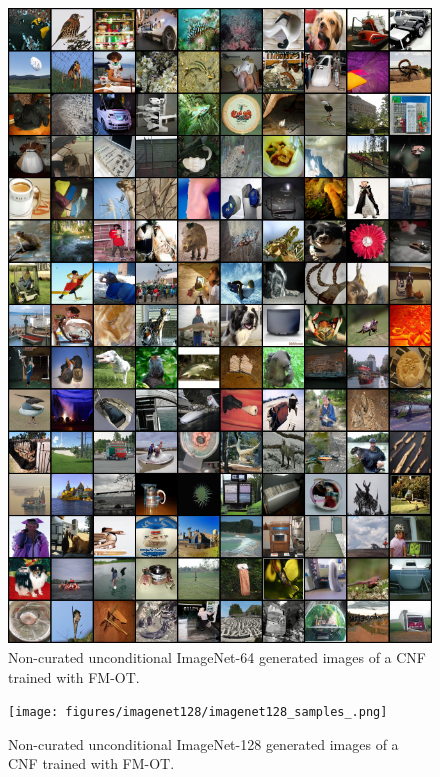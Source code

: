 \documentclass{article}
\begin{document}
\begin{figure}
    \centering
    \includegraphics[width=\textwidth]{figures/imagenet64/imagenet64_samples.png}
    \caption{Non-curated unconditional ImageNet-64 generated images of a CNF trained with FM-OT. }
    \label{fig:imagenet64_samples}
\end{figure}


\begin{figure}
    \centering
    \texttt{[image: figures/imagenet128/imagenet128\_samples\_.png]}
    \caption{Non-curated unconditional ImageNet-128 generated images of a CNF trained with FM-OT. }
    \label{fig:imagenet128_samples}
\end{figure}
\end{document}
